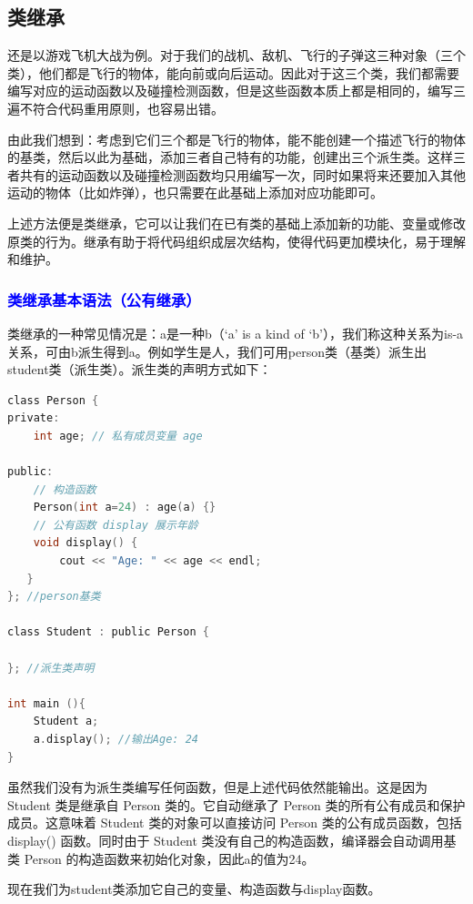 \documentclass[UTF8]{ctexart}
\begin{document}
\subsection{类继承}
还是以游戏飞机大战为例。对于我们的战机、敌机、飞行的子弹这三种对象（三个类），他们都是飞行的物体，能向前或向后运动。因此对于这三个类，我们都需要编写对应的运动函数以及碰撞检测函数，但是这些函数本质上都是相同的，编写三遍不符合代码重用原则，也容易出错。

由此我们想到：考虑到它们三个都是飞行的物体，能不能创建一个描述飞行的物体的基类，然后以此为基础，添加三者自己特有的功能，创建出三个派生类。这样三者共有的运动函数以及碰撞检测函数均只用编写一次，同时如果将来还要加入其他运动的物体（比如炸弹），也只需要在此基础上添加对应功能即可。

上述方法便是类继承，它可以让我们在已有类的基础上添加新的功能、变量或修改原类的行为。继承有助于将代码组织成层次结构，使得代码更加模块化，易于理解和维护。

\subsubsection{\textcolor{blue}{类继承基本语法（公有继承）}}
类继承的一种常见情况是：a是一种b（‘a’ is a kind of ‘b’），我们称这种关系为is-a关系，可由b派生得到a。例如学生是人，我们可用person类（基类）派生出student类（派生类）。派生类的声明方式如下：
\begin{lstlisting}[language = C,basicstyle=\small\ttfamily]
class Person {
private:
    int age; // 私有成员变量 age

public:
    // 构造函数
    Person(int a=24) : age(a) {}
    // 公有函数 display 展示年龄
    void display() {
        cout << "Age: " << age << endl;
   }
}; //person基类

class Student : public Person {

}; //派生类声明

int main (){
    Student a;
    a.display(); //输出Age: 24
}
\end{lstlisting}

虽然我们没有为派生类编写任何函数，但是上述代码依然能输出。这是因为Student 类是继承自 Person 类的。它自动继承了 Person 类的所有公有成员和保护成员。这意味着 Student 类的对象可以直接访问 Person 类的公有成员函数，包括 display() 函数。同时由于 Student 类没有自己的构造函数，编译器会自动调用基类 Person 的构造函数来初始化对象，因此a的值为24。

现在我们为student类添加它自己的变量、构造函数与display函数。
    
\end{document}
